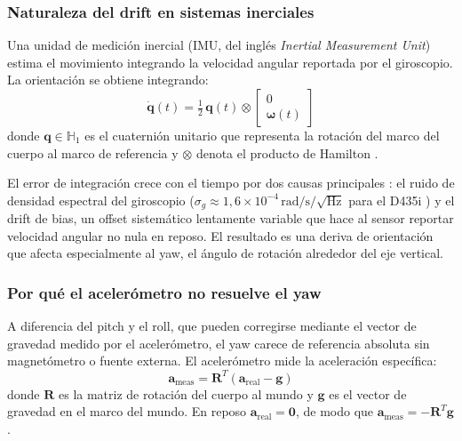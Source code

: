 \subsubsection{Naturaleza del drift en sistemas inerciales}

Una unidad de medición inercial (IMU, del inglés
\emph{Inertial Measurement Unit}) estima el movimiento integrando la
velocidad angular reportada por el giroscopio. La orientación se obtiene
integrando:
%
\begin{equation}
  \label{eq:gyro-integration}
  \dot{\mathbf{q}}(t) = \tfrac{1}{2}\,\mathbf{q}(t) \otimes
  \begin{bmatrix}0 \\ \boldsymbol{\omega}(t)\end{bmatrix}
\end{equation}
%
donde $\mathbf{q} \in \mathbb{H}_1$ es el cuaternión unitario que representa
la rotación del marco del cuerpo al marco de referencia y $\otimes$ denota el
producto de Hamilton \cite{Woodman2007}.

El error de integración crece con el tiempo por dos causas principales
\cite{Woodman2007}: el ruido de densidad espectral del giroscopio
($\sigma_g \approx 1{,}6 \times 10^{-4}\,\text{rad/s}/\!\sqrt{\text{Hz}}$
para el D435i \cite{RS-D400}) y el drift de bias, un offset sistemático
lentamente variable que hace al sensor reportar velocidad angular no nula en
reposo. El resultado es una deriva de orientación que afecta especialmente al
yaw, el ángulo de rotación alrededor del eje vertical.

\subsubsection{Por qué el acelerómetro no resuelve el yaw}

A diferencia del pitch y el roll, que pueden corregirse mediante el vector de
gravedad medido por el acelerómetro, el yaw carece de referencia absoluta sin
magnetómetro o fuente externa. El acelerómetro mide la aceleración específica:
%
\begin{equation}
  \label{eq:accel-model}
  \mathbf{a}_{\text{meas}} = \mathbf{R}^{T}(\mathbf{a}_{\text{real}} - \mathbf{g})
\end{equation}
%
donde $\mathbf{R}$ es la matriz de rotación del cuerpo al mundo y $\mathbf{g}$
es el vector de gravedad en el marco del mundo. En reposo
$\mathbf{a}_{\text{real}} = \mathbf{0}$, de modo que
$\mathbf{a}_{\text{meas}} = -\mathbf{R}^{T}\mathbf{g}$.

